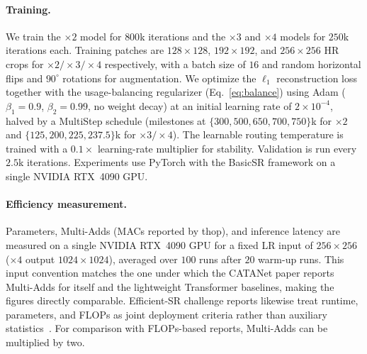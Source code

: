 \paragraph{Training.}
We train the $\times2$ model for $800$k iterations and the $\times3$ and $\times4$
models for $250$k iterations each. Training patches are $128{\times}128$, $192{\times}192$,
and $256{\times}256$ HR crops for $\times2/\times3/\times4$ respectively, with a
batch size of $16$ and random horizontal flips and $90^{\circ}$ rotations for
augmentation. We optimize the $\ell_1$ reconstruction loss together with the
usage-balancing regularizer (Eq.~\eqref{eq:balance}) using Adam
($\beta_1{=}0.9$, $\beta_2{=}0.99$, no weight decay) at an initial learning rate of
$2{\times}10^{-4}$, halved by a MultiStep schedule (milestones at
$\{300,500,650,700,750\}$k for $\times2$ and $\{125,200,225,237.5\}$k for
$\times3/\times4$). The learnable routing temperature is trained with a
$0.1{\times}$ learning-rate multiplier for stability. Validation is run every
$2{.}5$k iterations. Experiments use PyTorch with the BasicSR
framework on a single NVIDIA RTX~4090 GPU.

\paragraph{Efficiency measurement.}
Parameters, Multi-Adds (MACs reported by thop), and inference latency are measured
on a single NVIDIA RTX~4090 GPU for a fixed LR input of $256{\times}256$ ($\times4$
output $1024{\times}1024$), averaged over $100$ runs after $20$ warm-up runs. This input
convention matches the one under which the CATANet paper reports Multi-Adds for
itself and the lightweight Transformer baselines, making the figures directly
comparable. Efficient-SR challenge reports likewise treat runtime, parameters, and
FLOPs as joint deployment criteria rather than auxiliary statistics~\cite{ren2024ntire}.
For comparison with FLOPs-based reports, Multi-Adds can be multiplied by two.

